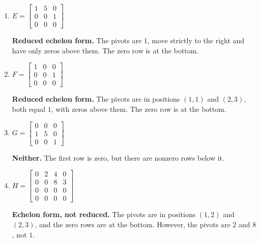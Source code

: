\begin{enumerate}[label=\alph*)]
    \item $E=
    \begin{bmatrix}
        1&5&0\\
        0&0&1\\
        0&0&0
    \end{bmatrix}$

    \begin{answer}
        \textbf{Reduced echelon form.}
        The pivots are $1$, move strictly to the right
        and have only zeros above them.
        The zero row is at the bottom.
    \end{answer}

    \item $F=
    \begin{bmatrix}
        1&0&0\\
        0&0&1\\
        0&0&0
    \end{bmatrix}$

    \begin{answer}
        \textbf{Reduced echelon form.}
        The pivots are in positions $(1,1)$ and $(2,3)$,
        both equal $1$, with zeros above them.
        The zero row is at the bottom.
    \end{answer}

    \item $G=
    \begin{bmatrix}
        0&0&0\\
        1&5&0\\
        0&0&1
    \end{bmatrix}$

    \begin{answer}
        \textbf{Neither.}
        The first row is zero, but there are
        nonzero rows below it.
    \end{answer}

    \item $H=
    \begin{bmatrix}
        0&2&4&0\\
        0&0&8&3\\
        0&0&0&0\\
        0&0&0&0
    \end{bmatrix}$

    \begin{answer}
        \textbf{Echelon form, not reduced.}
        The pivots are in positions $(1,2)$ and $(2,3)$,
        and the zero rows are at the bottom.
        However, the pivots are $2$ and $8$, not $1$.
    \end{answer}


\end{enumerate}
